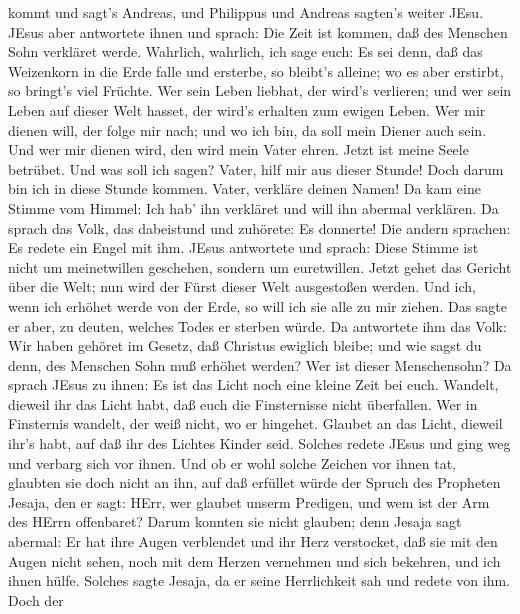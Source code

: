 kommt und sagt's Andreas, und Philippus und Andreas sagten's weiter
JEsu.  JEsus aber antwortete ihnen und sprach: Die Zeit ist
kommen, daß des Menschen Sohn verkläret werde.  Wahrlich,
wahrlich, ich sage euch: Es sei denn, daß das Weizenkorn in die Erde
falle und ersterbe, so bleibt's alleine; wo es aber erstirbt, so
bringt's viel Früchte.  Wer sein Leben liebhat, der wird's
verlieren; und wer sein Leben auf dieser Welt hasset, der wird's
erhalten zum ewigen Leben.  Wer mir dienen will, der folge
mir nach; und wo ich bin, da soll mein Diener auch sein. Und wer mir
dienen wird, den wird mein Vater ehren.  Jetzt ist meine
Seele betrübet. Und was soll ich sagen? Vater, hilf mir aus dieser
Stunde! Doch darum bin ich in diese Stunde kommen.  Vater,
verkläre deinen Namen! Da kam eine Stimme vom Himmel: Ich hab' ihn
verkläret und will ihn abermal verklären.  Da sprach das
Volk, das dabeistund und zuhörete: Es donnerte! Die andern sprachen: Es
redete ein Engel mit ihm.  JEsus antwortete und sprach:
Diese Stimme ist nicht um meinetwillen geschehen, sondern um
euretwillen.  Jetzt gehet das Gericht über die Welt; nun
wird der Fürst dieser Welt ausgestoßen werden.  Und ich,
wenn ich erhöhet werde von der Erde, so will ich sie alle zu mir ziehen.
 Das sagte er aber, zu deuten, welches Todes er sterben
würde.  Da antwortete ihm das Volk: Wir haben gehöret im
Gesetz, daß Christus ewiglich bleibe; und wie sagst du denn, des
Menschen Sohn muß erhöhet werden? Wer ist dieser Menschensohn?
 Da sprach JEsus zu ihnen: Es ist das Licht noch eine
kleine Zeit bei euch. Wandelt, dieweil ihr das Licht habt, daß euch die
Finsternisse nicht überfallen. Wer in Finsternis wandelt, der weiß
nicht, wo er hingehet.  Glaubet an das Licht, dieweil ihr's
habt, auf daß ihr des Lichtes Kinder seid.  Solches redete
JEsus und ging weg und verbarg sich vor ihnen. Und ob er wohl solche
Zeichen vor ihnen tat, glaubten sie doch nicht an ihn,  auf
daß erfüllet würde der Spruch des Propheten Jesaja, den er sagt: HErr,
wer glaubet unserm Predigen, und wem ist der Arm des HErrn offenbaret?
 Darum konnten sie nicht glauben; denn Jesaja sagt abermal:
 Er hat ihre Augen verblendet und ihr Herz verstocket, daß
sie mit den Augen nicht sehen, noch mit dem Herzen vernehmen und sich
bekehren, und ich ihnen hülfe.  Solches sagte Jesaja, da er
seine Herrlichkeit sah und redete von ihm.  Doch der
